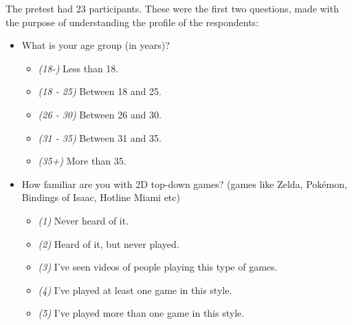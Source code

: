 The pretest had 23 participants. These were the first two questions, made with the purpose of understanding the profile of the respondents:
\begin{itemize}
    \item What is your age group (in years)?
    \begin{itemize}
        \item \emph{(18-)} Less than 18.
        \item \emph{(18 - 25)} Between 18 and 25.
        \item \emph{(26 - 30)} Between 26 and 30.
        \item \emph{(31 - 35)} Between 31 and 35.
        \item \emph{(35+)} More than 35.
    \end{itemize}
    \item How familiar are you with 2D top-down games? (games like Zelda, Pokémon, Bindings of Isaac, Hotline Miami etc)
    \begin{itemize}
        \item \emph{(1)} Never heard of it.
        \item \emph{(2)} Heard of it, but never played.
        \item \emph{(3)} I've seen videos of people playing this type of games.
        \item \emph{(4)} I've played at least one game in this style.
        \item \emph{(5)} I've played more than one game in this style.
    \end{itemize}
\end{itemize}

